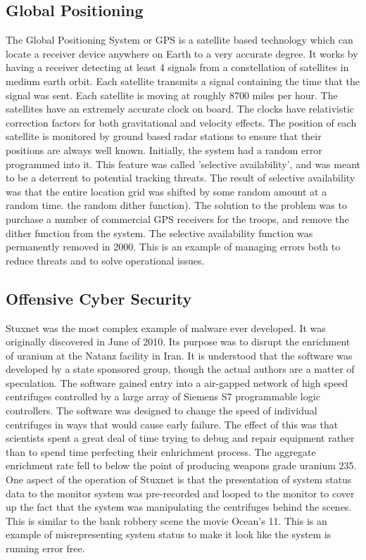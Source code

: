\documentclass[
	a4paper, %
	10pt, %
	unnumberedsections, %
	twoside, %
]{LTJournalArticle}
\begin{document}
\subsection{Global Positioning } 
The Global Positioning System or GPS is a satellite based technology which can locate a receiver
device anywhere on Earth to a very accurate degree. It works by having a receiver detecting at least
4 signals from a constellation of satellites in medium earth orbit. Each satellite transmits a 
signal containing the time that the signal was sent. Each satellite is moving at roughly 8700 miles per hour. 
The satellites have an extremely accurate clock on board. The clocks have relativistic correction factors for 
both gravitational and velocity effects. The position of each satellite is monitored by ground based radar stations 
to ensure that their positions are always well known. Initially, the system had a random error programmed into it. 
This feature was called 'selective availability', and was meant to be a deterrent to potential tracking threats. 
The result of selective availability was that the entire location grid was shifted by some random amount at a random time. 
the random dither function). The solution to the problem was to purchase a number of commercial GPS receivers for 
the troops, and remove the dither function from the system. The selective availability function was permanently removed 
in 2000. This is an example of managing errors both to reduce threats and to solve operational issues.  

\subsection{Offensive Cyber Security} 
Stuxnet was the most complex example of malware ever developed. It was originally discovered in June of 2010.
Its purpose was to disrupt the enrichment of uranium at the Natanz facility in Iran. It is understood that the software 
was developed by a state sponsored group, though the actual authors are a matter of speculation. The software gained entry
into a air-gapped network of high speed centrifuges controlled by a large array of Siemens S7 programmable logic
controllers. The software was designed to change the speed of individual centrifuges in ways that would cause early
failure. The effect of this was that scientists spent a great deal of time trying to debug and repair equipment rather 
than to spend time perfecting their enhrichment process. The aggregate enrichment rate fell to below the point of 
producing weapons grade uranium 235. One aspect of the operation of Stuxnet is that the presentation of system status
data to the monitor system was pre-recorded and looped to the monitor to cover up the fact that the system was 
manipulating the centrifuges behind the scenes. This is similar to the bank robbery scene the movie Ocean's 11.
This is an example of misrepresenting system status to make it look like the system is running error free. 
\end{document}
